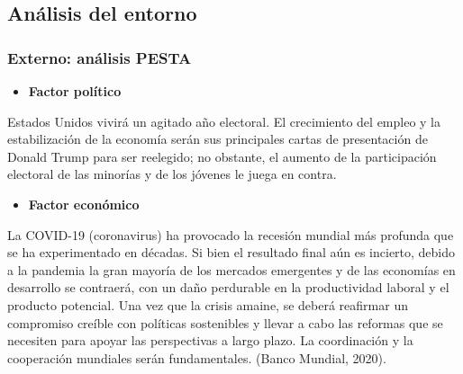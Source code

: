 \documentclass[
  stu,
  floatsintext,
  longtable,
  a4paper,
  nolmodern,
  notxfonts,
  notimes,
  colorlinks=true,linkcolor=blue,citecolor=blue,urlcolor=blue]{apa7}
\providecommand{\tightlist}{%
  \setlength{\itemsep}{0pt}\setlength{\parskip}{0pt}}
\begin{document}
\subsection{Análisis del entorno}\label{anuxe1lisis-del-entorno}

\subsubsection{Externo: análisis PESTA}\label{externo-anuxe1lisis-pesta}

\begin{itemize}
\tightlist
\item
  \textbf{Factor político}
\end{itemize}

Estados Unidos vivirá un agitado año electoral. El crecimiento del
empleo y la estabilización de la economía serán sus principales cartas
de presentación de Donald Trump para ser reelegido; no obstante, el
aumento de la participación electoral de las minorías y de los jóvenes
le juega en contra.

\begin{itemize}
\tightlist
\item
  \textbf{Factor económico}
\end{itemize}

La COVID-19 (coronavirus) ha provocado la recesión mundial más profunda
que se ha experimentado en décadas. Si bien el resultado final aún es
incierto, debido a la pandemia la gran mayoría de los mercados
emergentes y de las economías en desarrollo se contraerá, con un daño
perdurable en la productividad laboral y el producto potencial. Una vez
que la crisis amaine, se deberá reafirmar un compromiso creíble con
políticas sostenibles y llevar a cabo las reformas que se necesiten para
apoyar las perspectivas a largo plazo. La coordinación y la cooperación
mundiales serán fundamentales. (Banco Mundial, 2020).
\end{document}
